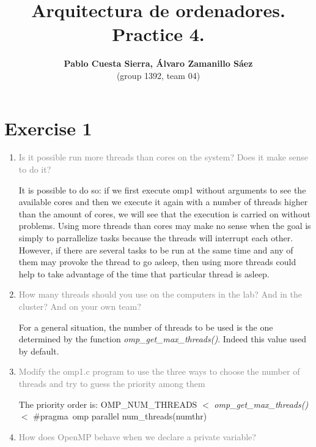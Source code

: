 \documentclass{article}
\begin{document}
\title{\textbf{Arquitectura de ordenadores. Practice 4.}}
\author{\textbf{Pablo Cuesta Sierra, Álvaro Zamanillo Sáez}\\(group 1392, team 04)}
\maketitle

\begin{tcolorbox}
\tableofcontents
\end{tcolorbox}


\newpage
\section{Exercise 1}

\begin{enumerate}
\item \textcolor{gray}{Is it possible run more threads than cores on the system? Does it make sense to do it?}

It is possible to do so: if we first execute omp1 without arguments to see the available cores and then we execute it again with a number of threads higher than the amount of cores, we will see that the execution is carried on without problems. Using more threads than cores may make no sense when the goal is simply to parrallelize tasks because the threads will interrupt each other. However, if there are several tasks to be run at the same time and any of them may provoke the thread to go asleep, then using more threads could help to take advantage of the time that particular thread is asleep. 


\item \textcolor{gray}{How many threads should you use on the computers in the lab? And in the cluster? And on your own team?} 

For a general situation, the number of threads to be used is the one determined by the function \emph{omp\_get\_max\_threads()}. Indeed this value used by default.

\item \textcolor{gray}{Modify the omp1.c program to use the three ways to choose the number of threads and try to guess the priority among them}

The priority order is: \texttt{}{OMP\_NUM\_THREADS} $<$ \emph{omp\_get\_max\_threads()} $<$ \#pragma\ omp parallel num\_threads(numthr) 

\item \textcolor{gray}{How does OpenMP behave when we declare a private variable?}


\end{enumerate}
\end{document}
